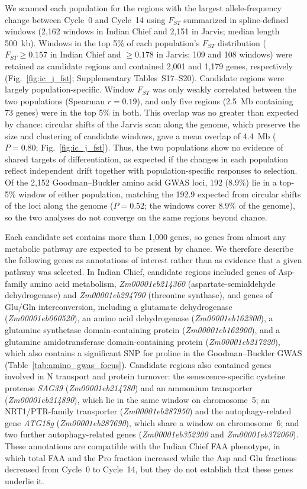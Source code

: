 We scanned each population for the regions with the largest allele-frequency change between Cycle~0 and Cycle~14 using $F_{ST}$ summarized in spline-defined windows (2,162 windows in Indian Chief and 2,151 in Jarvis; median length 500~kb). Windows in the top 5\% of each population's $F_{ST}$ distribution ($F_{ST} \geq 0.157$ in Indian Chief and $\geq 0.178$ in Jarvis; 109 and 108 windows) were retained as candidate regions and contained 2,001 and 1,179 genes, respectively (Fig.~\ref{fig:ic_j_fst}; Supplementary Tables~S17--S20). Candidate regions were largely population-specific. Window $F_{ST}$ was only weakly correlated between the two populations (Spearman $r = 0.19$), and only five regions (2.5~Mb containing 73 genes) were in the top 5\% in both. This overlap was no greater than expected by chance: circular shifts of the Jarvis scan along the genome, which preserve the size and clustering of candidate windows, gave a mean overlap of 4.4~Mb ($P = 0.80$; Fig.~\ref{fig:ic_j_fst}). Thus, the two populations show no evidence of shared targets of differentiation, as expected if the changes in each population reflect independent drift together with population-specific responses to selection. Of the 2,152 Goodman--Buckler amino acid GWAS loci, 192 (8.9\%) lie in a top-5\% window of either population, matching the 192.9 expected from circular shifts of the loci along the genome ($P = 0.52$; the windows cover 8.9\% of the genome), so the two analyses do not converge on the same regions beyond chance.

Each candidate set contains more than 1,000 genes, so genes from almost any metabolic pathway are expected to be present by chance. We therefore describe the following genes as annotations of interest rather than as evidence that a given pathway was selected. In Indian Chief, candidate regions included genes of Asp-family amino acid metabolism, \textit{Zm00001eb214360} (aspartate-semialdehyde dehydrogenase) and \textit{Zm00001eb294790} (threonine synthase), and genes of Glu/Gln interconversion, including a glutamate dehydrogenase (\textit{Zm00001eb060520}), an amino acid dehydrogenase (\textit{Zm00001eb162300}), a glutamine synthetase domain-containing protein (\textit{Zm00001eb162900}), and a glutamine amidotransferase domain-containing protein (\textit{Zm00001eb217220}), which also contains a significant SNP for proline in the Goodman--Buckler GWAS (Table~\ref{tab:amino_gwas_focus}). Candidate regions also contained genes involved in N transport and protein turnover: the senescence-specific cysteine protease \textit{SAG39} (\textit{Zm00001eb214780}) and an ammonium transporter (\textit{Zm00001eb214890}), which lie in the same window on chromosome~5; an NRT1/PTR-family transporter (\textit{Zm00001eb287950}) and the autophagy-related gene \textit{ATG18g} (\textit{Zm00001eb287690}), which share a window on chromosome~6; and two further autophagy-related genes (\textit{Zm00001eb352300} and \textit{Zm00001eb372060}). These annotations are compatible with the Indian Chief FAA phenotype, in which total FAA and the Pro fraction increased while the Asp and Glu fractions decreased from Cycle~0 to Cycle~14, but they do not establish that these genes underlie it.

